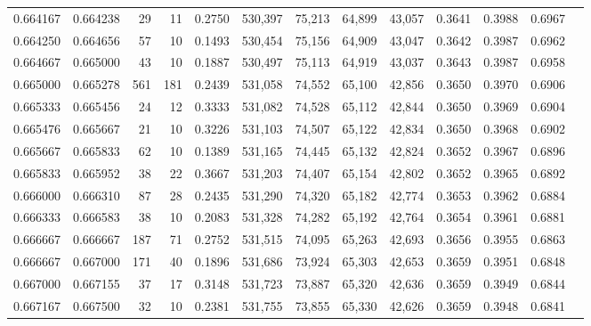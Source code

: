 \begin{tabular}{rrrrrrrrrrrrr}
0.664167 & 0.664238 &    29 &  11 &                                     0.2750 & 530,397 &  75,213 &  64,899 &  43,057 & 0.3641 & 0.3988 & 0.6967 \\
0.664250 & 0.664656 &    57 &  10 &                                     0.1493 & 530,454 &  75,156 &  64,909 &  43,047 & 0.3642 & 0.3987 & 0.6962 \\
0.664667 & 0.665000 &    43 &  10 &                                     0.1887 & 530,497 &  75,113 &  64,919 &  43,037 & 0.3643 & 0.3987 & 0.6958 \\
0.665000 & 0.665278 &   561 & 181 &                                     0.2439 & 531,058 &  74,552 &  65,100 &  42,856 & 0.3650 & 0.3970 & 0.6906 \\
0.665333 & 0.665456 &    24 &  12 &                                     0.3333 & 531,082 &  74,528 &  65,112 &  42,844 & 0.3650 & 0.3969 & 0.6904 \\
0.665476 & 0.665667 &    21 &  10 &                                     0.3226 & 531,103 &  74,507 &  65,122 &  42,834 & 0.3650 & 0.3968 & 0.6902 \\
0.665667 & 0.665833 &    62 &  10 &                                     0.1389 & 531,165 &  74,445 &  65,132 &  42,824 & 0.3652 & 0.3967 & 0.6896 \\
0.665833 & 0.665952 &    38 &  22 &                                     0.3667 & 531,203 &  74,407 &  65,154 &  42,802 & 0.3652 & 0.3965 & 0.6892 \\
0.666000 & 0.666310 &    87 &  28 &                                     0.2435 & 531,290 &  74,320 &  65,182 &  42,774 & 0.3653 & 0.3962 & 0.6884 \\
0.666333 & 0.666583 &    38 &  10 &                                     0.2083 & 531,328 &  74,282 &  65,192 &  42,764 & 0.3654 & 0.3961 & 0.6881 \\
0.666667 & 0.666667 &   187 &  71 &                                     0.2752 & 531,515 &  74,095 &  65,263 &  42,693 & 0.3656 & 0.3955 & 0.6863 \\
0.666667 & 0.667000 &   171 &  40 &                                     0.1896 & 531,686 &  73,924 &  65,303 &  42,653 & 0.3659 & 0.3951 & 0.6848 \\
0.667000 & 0.667155 &    37 &  17 &                                     0.3148 & 531,723 &  73,887 &  65,320 &  42,636 & 0.3659 & 0.3949 & 0.6844 \\
0.667167 & 0.667500 &    32 &  10 &                                     0.2381 & 531,755 &  73,855 &  65,330 &  42,626 & 0.3659 & 0.3948 & 0.6841 \\

\end{tabular}
